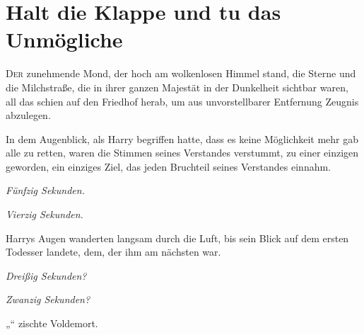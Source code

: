 \chapter{Halt die Klappe und tu das Unmögliche}

\lettrine{D}{er} zunehmende Mond, der hoch am wolkenlosen Himmel stand, die Sterne und die Milchstraße, die in ihrer ganzen Majestät in der Dunkelheit sichtbar waren, all das schien auf den Friedhof herab, um aus unvorstellbarer Entfernung Zeugnis abzulegen.

In dem Augenblick, als Harry begriffen hatte, dass es keine Möglichkeit mehr gab alle zu retten, waren die Stimmen seines Verstandes verstummt, zu einer einzigen geworden, ein einziges Ziel, das jeden Bruchteil seines Verstandes einnahm.

\emph{Fünfzig Sekunden.}

\emph{Vierzig Sekunden.}

Harrys Augen wanderten langsam durch die Luft, bis sein Blick auf dem ersten Todesser landete, dem, der ihm am nächsten war.

\emph{Dreißig Sekunden?}

\emph{Zwanzig Sekunden?}

„“ zischte Voldemort.

